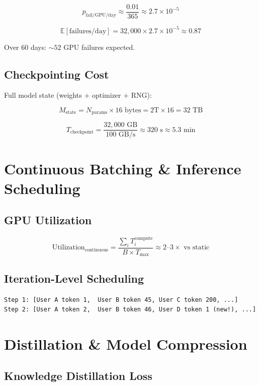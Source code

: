 \documentclass[11pt,a4paper]{article}
\begin{document}
$$p_{\text{fail/GPU/day}} \approx \frac{0.01}{365} \approx 2.7 \times 10^{-5}$$

$$\mathbb{E}[\text{failures/day}] = 32{,}000 \times 2.7 \times 10^{-5} \approx 0.87$$

Over 60 days: $\sim 52$ GPU failures expected.

\subsection{Checkpointing Cost}

Full model state (weights $+$ optimizer $+$ RNG):

$$M_{\text{state}} = N_{\text{params}} \times 16 \text{ bytes} = 2\text{T} \times 16 = 32 \text{ TB}$$

$$T_{\text{checkpoint}} = \frac{32{,}000 \text{ GB}}{100 \text{ GB/s}} \approx 320 \text{ s} \approx 5.3 \text{ min}$$

\section{Continuous Batching \& Inference Scheduling}

\subsection{GPU Utilization}

$$\text{Utilization}_{\text{continuous}} = \frac{\sum_i T_i^{\text{compute}}}{B \times T_{\max}} \approx 2\text{--}3\times \text{ vs static}$$

\subsection{Iteration-Level Scheduling}

\begin{lstlisting}
Step 1: [User A token 1,  User B token 45, User C token 200, ...]
Step 2: [User A token 2,  User B token 46, User D token 1 (new!), ...]
\end{lstlisting}

\section{Distillation \& Model Compression}

\subsection{Knowledge Distillation Loss}
\end{document}
